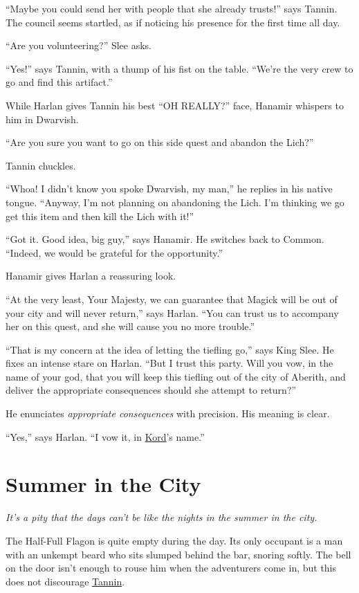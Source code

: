 \documentclass[smalldemyvopaper,11pt,twoside,onecolumn,openright,extrafontsizes]{memoir}
\newcommand{\chapdesc}[1]{
    \begin{flushright}
    \emph{{#1}}
    \end{flushright}
    \vspace{26pt}
}
\begin{document}
``Maybe you could send her with people that she already trusts!'' says
Tannin. The council seems startled, as if noticing his presence for the
first time all day.

``Are you volunteering?'' Slee asks.

``Yes!'' says Tannin, with a thump of his fist on the table. ``We're the
very crew to go and find this artifact.''

While Harlan gives Tannin his best ``OH REALLY?'' face, Hanamir whispers
to him in Dwarvish.

``Are you sure you want to go on this side quest and abandon the Lich?''

Tannin chuckles.

``Whoa! I didn't know you spoke Dwarvish, my man,'' he replies in his
native tongue. ``Anyway, I'm not planning on abandoning the Lich. I'm
thinking we go get this item and then kill the Lich with it!''

``Got it. Good idea, big guy,'' says Hanamir. He switches back to
Common. ``Indeed, we would be grateful for the opportunity.''

Hanamir gives Harlan a reassuring look.

``At the very least, Your Majesty, we can guarantee that Magick will be
out of your city and will never return,'' says Harlan. ``You can trust
us to accompany her on this quest, and she will cause you no more
trouble.''

``That is my concern at the idea of letting the tiefling go,'' says King
Slee. He fixes an intense stare on Harlan. ``But I trust this party.
Will you vow, in the name of your god, that you will keep this tiefling
out of the city of Aberith, and deliver the appropriate consequences
should she attempt to return?''

He enunciates \emph{appropriate consequences} with precision. His
meaning is clear.

``Yes,'' says Harlan. ``I vow it, in \href{/characters/kord/}{Kord}'s
name.''


\chapter{Summer in the City}
\chapdesc{It's a pity that the days can't be like the nights in the summer in the city.}

The Half-Full Flagon is quite empty during the day. Its only occupant is
a man with an unkempt beard who sits slumped behind the bar, snoring
softly. The bell on the door isn't enough to rouse him when the
adventurers come in, but this does not discourage
\href{/characters/tannin/}{Tannin}.
\end{document}
